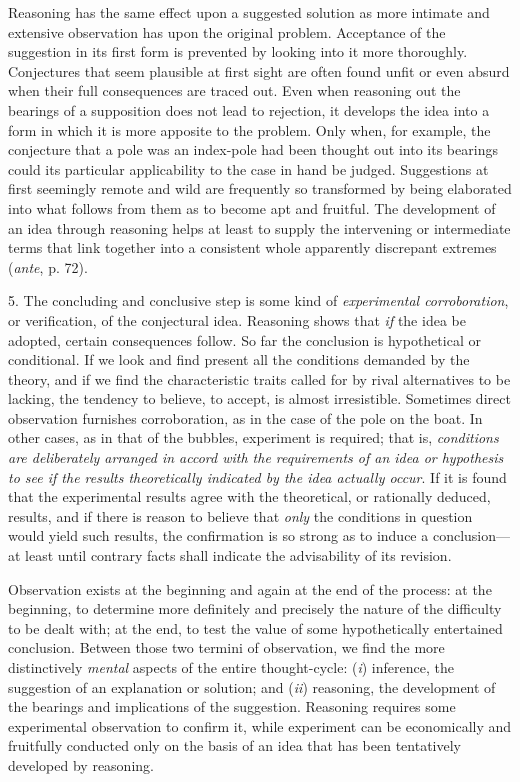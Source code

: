 \documentclass[letterpaper]{book}
\begin{document}
Reasoning has the same effect upon a suggested solution as more intimate
and extensive observation has upon the original problem. Acceptance of
the suggestion in its first form is prevented by looking into it more
thoroughly. Conjectures that seem plausible at first sight are often
found unfit or even absurd when their full consequences are traced out.
Even when reasoning out the bearings of a supposition does not lead to
rejection, it develops the idea into a form in which it is more apposite
to the problem. Only when, for example, the conjecture that a pole was
an index-pole had been thought out into its bearings could its
particular applicability to the case in hand be judged. Suggestions at
first seemingly remote and wild are frequently so transformed by being
elaborated into what follows from them as to become apt and fruitful.
The development of an idea through reasoning helps at least to supply
the intervening or intermediate terms that link together into a
consistent whole apparently discrepant extremes (\emph{ante}, p.
72).


5. The concluding and conclusive step is some kind of \emph{experimental
corroboration}, or verification, of the conjectural idea. Reasoning
shows that \emph{if} the idea be adopted, certain consequences follow.
So far the conclusion is hypothetical or conditional. If we look and
find present all the conditions demanded by the theory, and if we find
the characteristic traits called for by rival alternatives to be
lacking, the tendency to believe, to accept, is almost irresistible.
Sometimes direct observation furnishes corroboration, as in the case of
the pole on the boat. In other cases, as in that of the bubbles,
experiment is required; that is, \emph{conditions are deliberately
arranged in accord with the requirements of an idea or hypothesis to see
if the results theoretically indicated by the idea actually occur}. If
it is found that the experimental results agree with the theoretical, or
rationally deduced, results, and if there is reason to believe that
\emph{only} the conditions in question would yield such results, the
confirmation is so strong as to induce a conclusion---at least until
contrary facts shall indicate the advisability of its revision.


Observation exists at the beginning and again at the end of the process:
at the beginning, to determine more definitely and precisely the nature
of the difficulty to be dealt with; at the end, to test the value of
some hypothetically entertained conclusion. Between those two termini of
observation, we find the more distinctively \emph{mental} aspects of the
entire thought-cycle: (\emph{i}) inference, the suggestion of an
explanation or solution; and (\emph{ii}) reasoning, the development of
the bearings and implications of the suggestion. Reasoning requires some
experimental observation to confirm it, while experiment can be
economically and fruitfully conducted
only
on the basis of an idea that has been tentatively developed by
reasoning.
\end{document}
